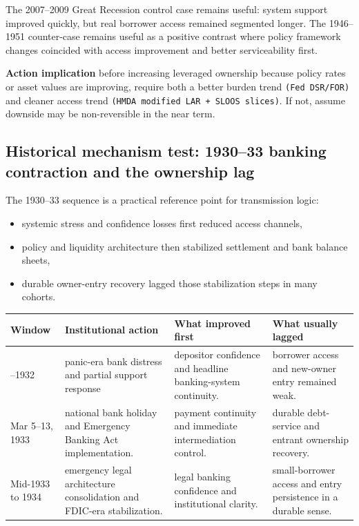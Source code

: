 \documentclass[11pt,openany]{book}
\begin{document}
The 2007--2009 Great Recession control case remains useful: system support improved quickly, but real borrower access remained segmented longer.
The 1946--1951 counter-case remains useful as a positive contrast where policy framework changes coincided with access improvement and better serviceability first.

\begin{signalbox}
\textbf{Action implication}
before increasing leveraged ownership because policy rates or asset values are improving, require both a better burden trend \texttt{(Fed DSR/FOR)} and cleaner access trend \texttt{(HMDA modified LAR + SLOOS slices)}. If not, assume downside may be non-reversible in the near term.
\end{signalbox}

\subsection{Historical mechanism test: 1930--33 banking contraction and the ownership lag}
\label{subsec:great-depression-ownership-lag}

The 1930--33 sequence is a practical reference point for transmission logic:

\begin{itemize}
  \item systemic stress and confidence losses first reduced access channels,
  \item policy and liquidity architecture then stabilized settlement and bank balance sheets,
  \item durable owner-entry recovery lagged those stabilization steps in many cohorts.
\end{itemize}

\begin{center}
\small
\begin{tabularx}{\textwidth}{>{\raggedright\arraybackslash}p{}>{\raggedright\arraybackslash}p{}>{\raggedright\arraybackslash}p{}X}
\toprule
\textbf{Window} & \textbf{Institutional action} & \textbf{What improved first} & \textbf{What usually lagged} \\
\midrule
1930--1932 & panic-era bank distress and partial support response & depositor confidence and headline banking-system continuity. & borrower access and new-owner entry remained weak. \\
Mar 5--13, 1933 & national bank holiday and Emergency Banking Act implementation. & payment continuity and immediate intermediation control. & durable debt-service and entrant ownership recovery. \\
Mid-1933 to 1934 & emergency legal architecture consolidation and FDIC-era stabilization. & legal banking confidence and institutional clarity. & small-borrower access and entry persistence in a durable sense. \\
\bottomrule
\end{tabularx}
\normalsize
\end{center}
\end{document}
